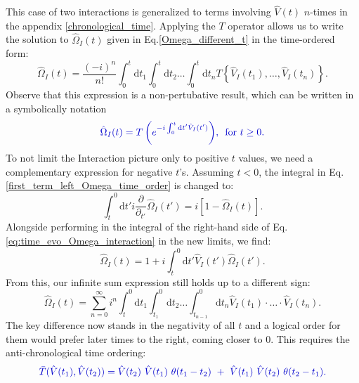 \documentclass[
11pt, %
english, %
singlespacing, %
headsepline, %
]{MastersDoctoralThesis} %
\begin{document}
This case of two interactions is generalized to terms involving $\hat{V}(t) $ $ n $-times in the appendix \ref{chronological_time}.  
Applying the $ T $ operator allows us to write the solution to $ \hat{\Omega}_{I}(t) $ given in Eq.\enskip\eqref{Omega_different_t} in the time-ordered form:
\begin{equation}\label{Omega_I_long_timeorderd}
\hat{\Omega}_{I}(t)
=
\frac{(-i)^{n}}{n!}
\int_{0}^{t}\mathrm{d}t_1\int_{0}^{t}\! \! \mathrm{d}t_2
 \ldots
 \int_{0}^{t}\! \! \mathrm{d}t_n
 T\left\lbrace \hat{V}_{I}(t_1), \ldots , \hat{V}_{I}(t_n)\right\rbrace 
 .
\end{equation}
Observe that this expression is a non-pertubative result, which can  be written in a symbolically notation
\begin{equation}\label{eq:Omega_I_Chron_0}
\textcolor[RGB]{0,0,204}{
\hat{\Omega}_{I}(t)
=T\left( e^{-i\int_{0}^{t}\mathrm{d}t^{\prime} \hat{V}_{I}(t^{\prime})} \right)
	\! ,\text{\enskip for  }  t\geq 0 
	.}
\end{equation}
To not limit the Interaction picture only to positive $ t $ values, we need a complementary expression for negative $ t $'s. Assuming $ t<0 $, the integral in Eq.\enskip\eqref{first_term_left_Omega_time_order} is changed to:
 \begin{equation}\label{first_term_left_anti_chrono}
 \int_{t}^{0}\mathrm{d}t'
 i
 \frac{\partial}{\partial_{t'}} 
 \hat{\Omega}_{I} (t')
 =
 i
 \left[ 
1 -\hat{\Omega}_{I}(t)
 \right] .
 \end{equation}
 Alongside performing in the integral of the right-hand side of  Eq.\enskip\eqref{eq:time_evo_Omega_interaction} in the new limits, we find:
 \begin{equation}
  \hat{\Omega}_{I}(t)=
1
+
i
\int^{0}_{t}\mathrm{d}t'\hat{V}_{I}(t')\hat{\Omega}_{I}(t')	.
  \end{equation} 
From this, our infinite sum expression still holds up to a different sign:
\begin{equation}\label{Omega_anti_without_anti}
\hat{\Omega}_{I}(t) =
\sum\limits_{n=0}^{\infty} 
i^{n}
\int^{0}_{t}\mathrm{d}t_1\int^{0}_{t_{1}}\! \! \mathrm{d}t_2
 \ldots
 \int^{0}_{t_{n-1}}\! \! \mathrm{d}t_n
  \hat{V}_{I}(t_1)\cdot \ldots \cdot \hat{V}_{I}(t_n).
\end{equation}
The key difference now stands in the negativity of all $ t $ and a logical order for them would prefer later times to the right, coming closer to $ 0 $. This requires the anti-chronological time ordering:
 \begin{equation}\label{eq:anti-chron-time_ordering}
\textcolor[RGB]{0,0,204}{
\bar{T}(\hat{V}(t_1), \hat{V}(t_2))=\hat{V}(t_2)\ \hat{V}(t_1)\ \theta (t_1 -t_2)\ +\ \hat{V}(t_1)\  \hat{V}(t_2) \ \theta (t_2-t_1)
.}
\end{equation}
\end{document}
